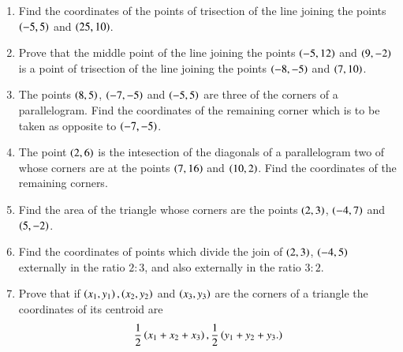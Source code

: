 \begin{enumerate}[1.]
\item Find the coordinates of the points of trisection of the line joining the points $\left(-5,5\right)$ and $\left(25,10\right)$.
\item Prove that the middle point of the line joining the points $\left(-5,12\right)$ and $\left(9,-2\right)$ is a point of trisection of the line
joining the points $\left(-8,-5\right)$ and $\left(7,10\right)$.
\item The points $\left(8,5\right)$, $\left(-7,-5\right)$ and $\left(-5,5\right)$ are three of the corners of a parallelogram.  Find the coordinates of
the remaining corner which is to be taken as opposite to $\left(-7,-5\right)$.
\item The point $\left(2,6\right)$ is the intesection of the diagonals of a parallelogram two of whose corners are at the points $\left(7,16\right)$ and $\left(10,2\right)$.
Find the coordinates of the remaining corners.
\item Find the area of the triangle whose corners are the points $\left(2,3\right)$, $\left(-4,7\right)$ and $\left(5,-2\right)$.  
\item Find the coordinates of  points which divide the join of $\left(2,3\right)$, $\left(-4,5\right)$ externally in the ratio $2:3$, and also
externally in the ratio $3:2$.
\item Prove that if $\left(x_1,y_1\right),\left(x_2,y_2\right)$ and $\left(x_3,y_3\right)$ are the corners of a triangle the coordinates of its centroid are
\begin{equation*}
\frac{1}{2}\left(x_1+x_2+x_3\right), \frac{1}{2}\left(y_1+y_2+y_3.\right)
\end{equation*}
\end{enumerate}
%

% 
% 
%




